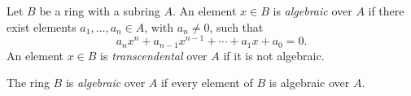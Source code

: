 \documentclass{article}
\begin{document}
Let $B$ be a ring with a subring $A$. An element $x \in B$ is {\em algebraic} over $A$ if there exist elements $a_1, \dots, a_n \in A$, with $a_n \neq 0$, such that
$$
a_n x^n + a_{n-1} x^{n-1} + \cdots + a_1 x + a_0 = 0.
$$
An element $x \in B$ is {\em transcendental} over $A$ if it is not algebraic.

The ring $B$ is {\em algebraic} over $A$ if every element of $B$ is algebraic over $A$.
\end{document}
